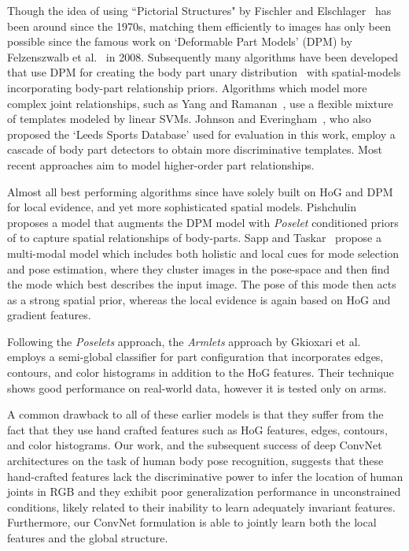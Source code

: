 Though the idea of using ``Pictorial Structures"  by Fischler and Elschlager~\cite{Fischler73} has been around since the 1970s, matching them efficiently to images has only been possible since the famous work on `Deformable Part Models' (DPM) by Felzenszwalb et al.~\cite{felzenszwalb2008discriminatively} in 2008. Subsequently many algorithms have been developed that use DPM for creating the body part unary distribution~\cite{andriluka2009pictorial, Eichner:2009:BAM, yang11cvpr, dantone13cvpr} with spatial-models incorporating body-part relationship priors. Algorithms which model more complex joint relationships, such as Yang and Ramanan~\cite{yang11cvpr}, use a flexible mixture of templates modeled by linear SVMs. Johnson and Everingham~\cite{johnson11cvpr}, who also proposed the `Leeds Sports Database' used for evaluation in this work, employ a cascade of body part detectors to obtain more discriminative templates. Most recent approaches aim to model higher-order part relationships. 

Almost all best performing algorithms since have solely built on HoG and DPM for local evidence, and yet more sophisticated spatial models. Pishchulin~\cite{pishchulin13cvpr, pishchulin13iccv} proposes a model that augments the DPM model with \emph{Poselet} conditioned priors of \cite{PoseletsICCV09} to capture spatial relationships of body-parts. Sapp and Taskar~\cite{modec} propose a multi-modal model which includes both holistic and local cues for mode selection and pose estimation, where they cluster images in the pose-space and then find the mode which best describes the input image. The pose of this mode then acts as a strong spatial prior, whereas the local evidence is again based on HoG and gradient features.

Following the \emph{Poselets} approach, the \emph{Armlets} approach by Gkioxari et al.~\cite{Gkioxari:2013:APE} employs a semi-global classifier for part configuration that incorporates edges, contours, and color histograms in addition to the HoG features. Their technique shows good performance on real-world data, however it is tested only on arms. 

A common drawback to all of these earlier models is that they suffer from the fact that they use hand crafted features such as HoG features, edges, contours, and color histograms. Our work, and the subsequent success of deep ConvNet architectures on the task of human body pose recognition, suggests that these hand-crafted features lack the discriminative power to infer the location of human joints in RGB and they exhibit poor generalization performance in unconstrained conditions, likely related to their inability to learn adequately invariant features.  Furthermore, our ConvNet formulation is able to jointly learn both the local features and the global structure.

